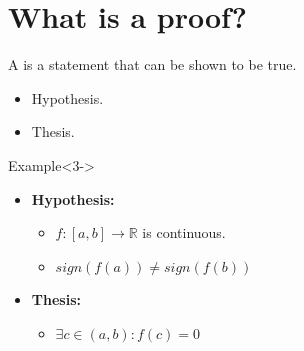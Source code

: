 \documentclass[11pt,a4paper,xcolor=dvipsnames, leqno]{beamer}
\begin{document}
\section{What is a proof?}
\begin{frame}
A  is a statement that can be shown to be true.
\begin{itemize}
\item <2->Hypothesis.
\item <2->Thesis.
\end{itemize}
\begin{block}{Example}<3->
\begin{itemize}
\item<4-> \textbf{Hypothesis:}
\begin{itemize}
\item<5-> $f:[a, b]\rightarrow \mathbb{R}$ is continuous.
\item<5-> $sign(f(a)) \neq sign(f(b))$
\end{itemize}
\item<4-> \textbf{Thesis:}
\begin{itemize}
\item<6-> $\exists c\in (a, b): f(c) = 0$
\end{itemize}
\end{itemize}
\end{block}
\end{frame}
\end{document}
